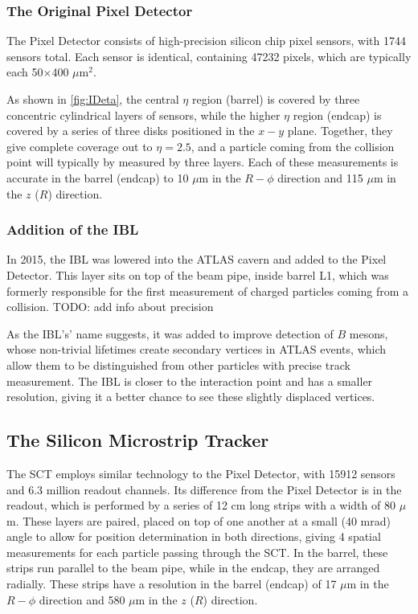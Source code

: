 \subsubsection{The Original Pixel Detector}

The Pixel Detector consists of high-precision silicon chip pixel sensors, with 1744 sensors total. Each sensor is identical, containing 47232 pixels, which are typically each 50$\times$400 $\mu$m$^2$. 

As shown in \autoref{fig:IDeta}, the central $\eta$ region (barrel) is covered by three concentric cylindrical layers of sensors, while the higher $\eta$ region (endcap) is covered by a series of three disks positioned in the $x-y$ plane. Together, they give complete coverage out to $\eta = 2.5$, and a particle coming from the collision point will typically by measured by three layers. Each of these measurements is accurate in the barrel (endcap) to 10 $\mu$m in the $R-\phi$ direction and 115 $\mu$m in the $z$ ($R$) direction.  

\subsubsection{Addition of the IBL}

In 2015, the \ac{IBL} was lowered into the ATLAS cavern and added to the Pixel Detector. This layer sits on top of the beam pipe, inside barrel L1, which was formerly responsible for the first measurement of charged particles coming from a collision. 
TODO: add info about precision 


As the \ac{IBL}'s' name suggests, it was added to improve detection of $B$ mesons, whose non-trivial lifetimes create secondary vertices in ATLAS events, which allow them to be distinguished from other particles with precise track measurement. The \ac{IBL} is closer to the interaction point and has a smaller resolution, giving it a better chance to see these slightly displaced vertices.

\subsection{The Silicon Microstrip Tracker}

The \ac{SCT} employs similar technology to the Pixel Detector, with 15912 sensors and 6.3 million readout channels. Its difference from the Pixel Detector is in the readout, which is performed by a series of 12 cm long strips with a width of 80 $\mu$m. These layers are paired, placed on top of one another at a small (40 mrad) angle to allow for position determination in both directions, giving 4 spatial measurements for each particle passing through the \ac{SCT}. In the barrel, these strips run parallel to the beam pipe, while in the endcap, they are arranged radially. These strips have a resolution in the barrel (endcap) of 17 $\mu$m in the $R-\phi$ direction and 580 $\mu$m in the $z$ ($R$) direction. 


